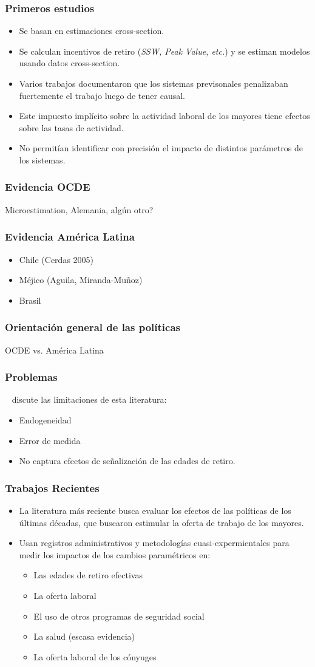 \documentclass{beamer}
\begin{document}
\frame
{
  \frametitle{Primeros estudios}
  \begin{itemize}
  \item Se basan en estimaciones cross-section.
  \item Se calculan incentivos de retiro (\textit{SSW, Peak Value, etc.}) y se estiman modelos usando datos cross-section.
  \item Varios trabajos documentaron que los sistemas previsonales penalizaban fuertemente el trabajo luego de tener causal.
  \item Este impuesto implícito sobre la actividad laboral de los mayores tiene efectos sobre las tasas de actividad.
  \item No permitían identificar con precisión el impacto de distintos parámetros de los sistemas.
  \end{itemize}
}

\frame
{
  \frametitle{Evidencia OCDE}
  Microestimation, Alemania, algún otro?
}

\frame
{
  \frametitle{Evidencia América Latina}
  \begin{itemize}
  \item Chile (Cerdas 2005)
  \item Méjico (Aguila, Miranda-Muñoz)
  \item Brasil
  \end{itemize}
}

\frame
{
  \frametitle{Orientación general de las políticas}
  
  OCDE vs. América Latina
  
  
}



\frame
{
  \frametitle{Problemas}
  
  ~\cite{mastrobouni09} discute las limitaciones de esta literatura:
  \begin{itemize}
  \item Endogeneidad
  \item Error de medida
  \item No captura efectos de señalización de las edades de retiro.
  \end{itemize}
}

\frame
{
  \frametitle{Trabajos Recientes}
  
  \begin{itemize}
  \item La literatura más reciente busca evaluar los efectos de las políticas de los últimas décadas, que buscaron estimular la oferta de trabajo de los mayores.
  \item Usan registros administrativos y metodologías cuasi-expermientales para medir los impactos de los cambios paramétricos en:
    \begin{itemize}
     \item Las edades de retiro efectivas
     \item La oferta laboral
     \item El uso de otros programas de seguridad social
     \item La salud (escasa evidencia)
     \item La oferta laboral de los cónyuges
     \end{itemize}
  \end{itemize}
}
\end{document}
